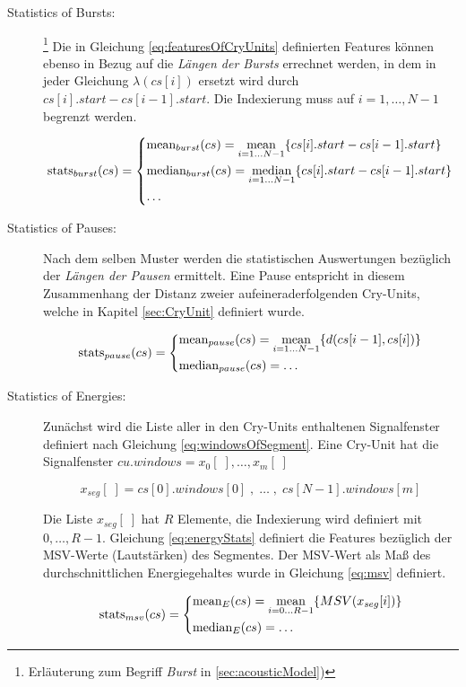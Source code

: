 \begin{description}
\item[Statistics of Bursts:]\footnote{Erläuterung zum Begriff \emph{Burst} in  \ref{sec:acousticModel})} Die in Gleichung \ref{eq:featuresOfCryUnits} definierten Features können ebenso in Bezug auf die \emph{Längen der Bursts} errechnet werden, in dem in jeder Gleichung $\lambda(cs[i])$ ersetzt wird durch $cs[i].start - cs[i-1].start$. Die Indexierung muss auf $i = 1 ,\ldots, N-1$ begrenzt werden.

\begin{equation}
\text{stats}_{burst}(cs) = 
\begin{dcases}
\text{mean}_{burst}(cs) = \operatorname*{mean}_{i = 1 \ldots N-1}\{cs[i].start - cs[i-1].start\} \\
\text{median}_{burst}(cs) = \operatorname*{median}_{i = 1 \ldots N-1}\{cs[i].start - cs[i-1].start\} \\
\ldots
\end{dcases}
\label{eq:featuresOfBursts}
\end{equation}

\item[Statistics of Pauses:] Nach dem selben Muster werden die statistischen Auswertungen bezüglich der  \emph{Längen der Pausen} ermittelt. Eine Pause entspricht in diesem Zusammenhang der Distanz zweier aufeineraderfolgenden Cry-Units, welche in Kapitel \ref{sec:CryUnit} definiert wurde.

\begin{equation}
\text{stats}_{pause}(cs) = 
\begin{dcases}
\text{mean}_{pause}(cs) = \operatorname*{mean}_{i = 1 \ldots N-1}\{d(cs[i-1],cs[i])\} \\
\text{median}_{pause}(cs)  = \ldots
\end{dcases}
\end{equation}

\item[Statistics of Energies:] Zunächst wird die Liste aller in den Cry-Units enthaltenen Signalfenster definiert nach Gleichung \ref{eq:windowsOfSegment}. Eine Cry-Unit hat die Signalfenster $cu.windows = x_0[\;],\ldots,x_m[\;]$

\begin{equation}
x_{seg}[\; ] = cs[0].windows[0] \;  , \; \ldots \; , \; cs[N-1].windows[m] 
\label{eq:windowsOfSegment}
\end{equation}

Die Liste $x_{seg}[\; ]$ hat $R$ Elemente, die Indexierung wird definiert mit $0, \ldots, R-1$. Gleichung \ref{eq:energyStats} definiert die Features bezüglich der MSV-Werte (\glqq Lautstärken\grqq ) des Segmentes. Der MSV-Wert als Maß des durchschnittlichen Energiegehaltes wurde in Gleichung \ref{eq:msv} definiert.

\begin{equation}
\text{stats}_{msv}(cs) = 
\begin{dcases}
\text{mean}_{E}(cs) = \operatorname*{mean}_{i = 0 \ldots R-1}\{MSV(x_{seg}[i])\} \\
\text{median}_{E}(cs)  = \ldots
\end{dcases}
\label{eq:energyStats}
\end{equation}

\end{description}

